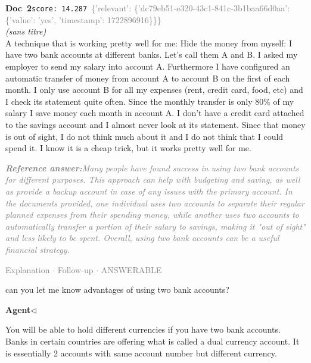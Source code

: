 \documentclass[a4paper,11pt]{article}
\begin{document}
\begin{docenv}
{\footnotesize\textcolor{doccolor}{\textbf{Doc~2}}}\hfill{\tiny\texttt{score:~14.287}}\ {\tiny\textcolor{gray}{\{'relevant': \{'dc79eb51-e320-43c1-841c-3b1baa66d0aa': \{'value': 'yes', 'timestamp': 1722896916\}\}\}}}\\[3pt]
{\small\textit{(sans titre)}}\\[2pt]
\vspace{2pt}
{\footnotesize 
A technique that is working pretty well for me: Hide the money from myself: I have two bank accounts at different banks. Let's call them A and B. I asked my employer to send my salary into account A. Furthermore I have configured an automatic transfer of money from account A to account B on the first of each month.  I only use account B for all my expenses (rent, credit card, food, etc) and I check its statement quite often. Since the monthly transfer is only 80\% of my salary I save money each month in account A. I don't have a credit card attached to the savings account and I almost never look at its statement. Since that money is out of sight, I do not think much about it and I do not think that I could spend it. I know it is a cheap trick, but it works pretty well for me.}
\end{docenv}
\begin{refanswerenv}
{\footnotesize\textit{\textcolor{gray}{\textbf{Reference answer:}\enspace Many people have found success in using two bank accounts for different purposes. This approach can help with budgeting and saving, as well as provide a backup account in case of any issues with the primary account. In the documents provided, one individual uses two accounts to separate their regular planned expenses from their spending money, while another uses two accounts to automatically transfer a portion of their salary to savings, making it "out of sight" and less likely to be spent. Overall, using two bank accounts can be a useful financial strategy.}}}
\end{refanswerenv}
\vspace{0.5em}
\hfill{\tiny\textcolor{gray}{Explanation $\cdot$ Follow-up $\cdot$ ANSWERABLE}}
\begin{userbubble}
can you let me know advantages of using two bank accounts?
\end{userbubble}
\noindent\hfill{\small\textcolor{agentcolor}{\textbf{Agent\enspace$\triangleleft$}}}
\begin{agentbubble}
You will be able to hold different currencies if you have two bank accounts. Banks in certain countries are offering what is called a dual currency account. It is essentially 2 accounts with same account number but different currency.
\end{agentbubble}
\end{document}
